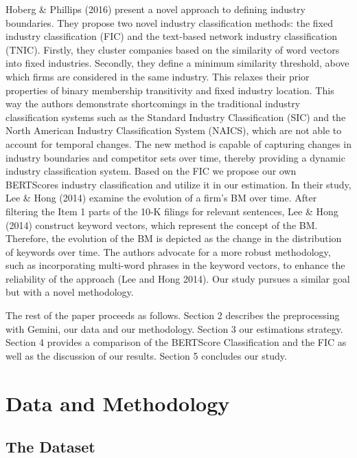 \documentclass[
]{article}
\begin{document}
Hoberg \& Phillips (2016) present a novel approach to defining industry
boundaries. They propose two novel industry classification methods: the
fixed industry classification (FIC) and the text-based network industry
classification (TNIC). Firstly, they cluster companies based on the
similarity of word vectors into fixed industries. Secondly, they define
a minimum similarity threshold, above which firms are considered in the
same industry. This relaxes their prior properties of binary membership
transitivity and fixed industry location. This way the authors
demonstrate shortcomings in the traditional industry classification
systems such as the Standard Industry Classification (SIC) and the North
American Industry Classification System (NAICS), which are not able to
account for temporal changes. The new method is capable of capturing
changes in industry boundaries and competitor sets over time, thereby
providing a dynamic industry classification system. Based on the FIC we
propose our own BERTScores industry classification and utilize it in our
estimation. In their study, Lee \& Hong (2014) examine the evolution of
a firm's BM over time. After filtering the Item 1 parts of the 10-K
filings for relevant sentences, Lee \& Hong (2014) construct keyword
vectors, which represent the concept of the BM. Therefore, the evolution
of the BM is depicted as the change in the distribution of keywords over
time. The authors advocate for a more robust methodology, such as
incorporating multi-word phrases in the keyword vectors, to enhance the
reliability of the approach (Lee and Hong 2014). Our study pursues a
similar goal but with a novel methodology.

The rest of the paper proceeds as follows. Section 2 describes the
preprocessing with Gemini, our data and our methodology. Section 3 our
estimations strategy. Section 4 provides a comparison of the BERTScore
Classification and the FIC as well as the discussion of our results.
Section 5 concludes our study.

\section{Data and Methodology}\label{data-and-methodology}

\subsection{The Dataset}\label{the-dataset}
\end{document}
